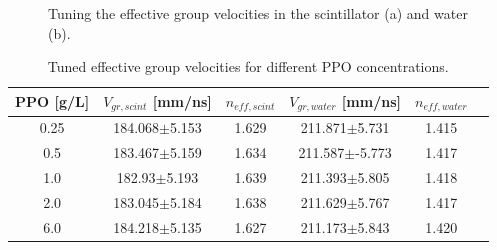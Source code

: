 \begin{figure}[htbp]
		\caption[Tuning the effective group velocities in the scintillator and water.]{Tuning the effective group velocities in the scintillator (a) and water (b).\label{fig:scint_groupVelocity}}
\end{figure}

\begin{table}[ht]
	\centering
	\caption{\label{partial_groupV}Tuned effective group velocities for different PPO concentrations.}	
	{\centering
		\begin{tabular*}{140mm}{c@{\extracolsep{\fill}}ccccc}
			\toprule 
			PPO [g/L] & $V_{gr,scint}$ [mm/ns]& $n_{eff,scint}$ & $V_{gr,water}$ [mm/ns]& $n_{eff,water}$\\
			\midrule
			0.25 & 184.068$\pm$5.153 & 1.629 & 211.871$\pm$5.731 & 1.415\\
			0.5  & 183.467$\pm$5.159 &1.634& 211.587$\pm$-5.773 & 1.417 \\
			1.0 & 182.93$\pm$5.193 &1.639& 211.393$\pm$5.805& 1.418 \\
			2.0 & 183.045$\pm$5.184& 1.638& 211.629$\pm$5.767 & 1.417	\\
			6.0 & 184.218$\pm$5.135& 1.627& 211.173$\pm$5.843 &1.420\\
			\bottomrule	
		\end{tabular*}
	}
\end{table}

